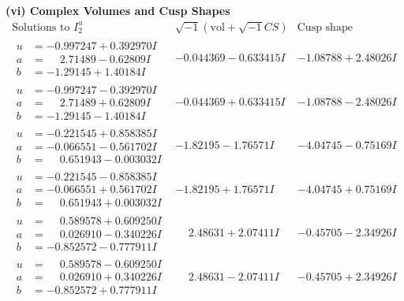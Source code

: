 \documentclass[1p]{elsarticle_modified}
\theoremstyle{definition}
\newcommand{\I}{\sqrt{-1}}
\begin{document}
\newpage\flushleft \textbf{(vi) Complex Volumes and Cusp Shapes}
$$\begin{array}{c|c|c}  
\text{Solutions to }I^u_{2}& \I (\text{vol} + \sqrt{-1}CS) & \text{Cusp shape}\\
 \hline 
\begin{aligned}
u &= -0.997247 + 0.392970 I \\
a &= \phantom{-}2.71489 - 0.62809 I \\
b &= -1.29145 + 1.40184 I\end{aligned}
 & -0.044369 - 0.633415 I & -1.08788 + 2.48026 I \\ \hline\begin{aligned}
u &= -0.997247 - 0.392970 I \\
a &= \phantom{-}2.71489 + 0.62809 I \\
b &= -1.29145 - 1.40184 I\end{aligned}
 & -0.044369 + 0.633415 I & -1.08788 - 2.48026 I \\ \hline\begin{aligned}
u &= -0.221545 + 0.858385 I \\
a &= -0.066551 - 0.561702 I \\
b &= \phantom{-}0.651943 - 0.003032 I\end{aligned}
 & -1.82195 - 1.76571 I & -4.04745 - 0.75169 I \\ \hline\begin{aligned}
u &= -0.221545 - 0.858385 I \\
a &= -0.066551 + 0.561702 I \\
b &= \phantom{-}0.651943 + 0.003032 I\end{aligned}
 & -1.82195 + 1.76571 I & -4.04745 + 0.75169 I \\ \hline\begin{aligned}
u &= \phantom{-}0.589578 + 0.609250 I \\
a &= \phantom{-}0.026910 - 0.340226 I \\
b &= -0.852572 - 0.777911 I\end{aligned}
 & \phantom{-}2.48631 + 2.07411 I & -0.45705 - 2.34926 I \\ \hline\begin{aligned}
u &= \phantom{-}0.589578 - 0.609250 I \\
a &= \phantom{-}0.026910 + 0.340226 I \\
b &= -0.852572 + 0.777911 I\end{aligned}
 & \phantom{-}2.48631 - 2.07411 I & -0.45705 + 2.34926 I \\ \hline\begin{aligned}

\end{aligned}
\end{array}$$
\end{document}
